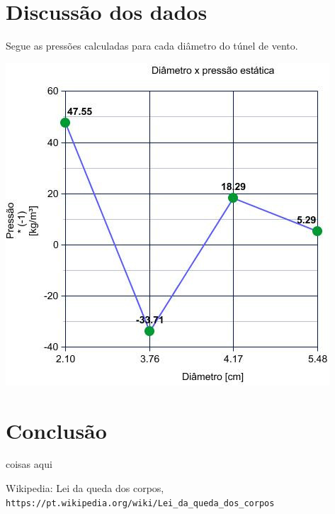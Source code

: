 \documentclass[a4paper]{article}
\begin{document}
\section{Discussão dos dados}
    Segue as pressões calculadas para cada diâmetro do túnel de vento.
        \begin{center}
              \includegraphics[width=.6\linewidth]{img/graph.jpg}
              \label{graph}
        \end{center}

\section{Conclusão}
    coisas aqui

\begin{thebibliography}{1}

    Wikipedia: Lei da queda dos corpos,
    \\\texttt{https://pt.wikipedia.org/wiki/Lei\_da\_queda\_dos\_corpos}
\end{thebibliography}
\end{document}
